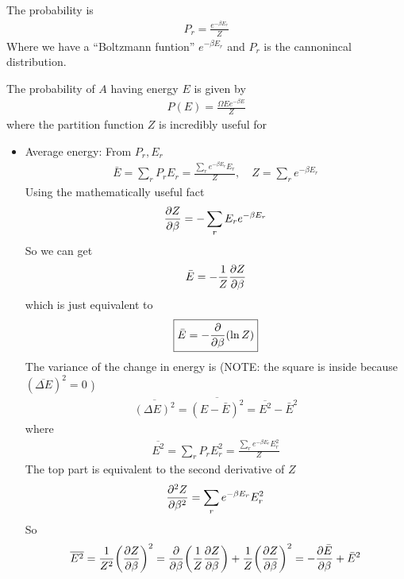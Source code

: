 \documentclass[../main.tex]{subfiles}
\begin{document}
The probability is
\begin{align*}
    P_r = \frac{e^{-\beta E_r}}{Z}
\end{align*}
Where we have a ``Boltzmann funtion'' $e^{-\beta E_r}$ and $P_r$ is the cannonincal distribution.

\newpage
{}
The probability of $A$ having energy $E$ is given by
\begin{align*}
    P(E) = \frac{\Omega{E} e^{-\beta E}}{Z} 
\end{align*}
where the partition function $Z$ is incredibly useful for
\begin{itemize}
    \item Average energy: From $P_r, E_r$
    \begin{align*}
        \bar E = \sum_r P_r E_r = \frac{\sum_r e^{-\beta E_r} E_r}{Z}, \quad Z = \sum_r e^{-\beta E_r}
    \end{align*}
    Using the mathematically useful fact
    \begin{align*}
        \pdv{Z}{\beta} = -\sum_r E_r e^{-\beta E_r}
    \end{align*}
    So we can get
    \begin{align*}
        \bar E = -\frac{1}{Z} \pdv{Z}{\beta}
    \end{align*}
    which is just equivalent to
    \begin{align*}
        \boxed{
            \bar E = -\pdv{\beta}(\ln Z)
        }
    \end{align*}
    The variance of the change in energy is (NOTE: the square is inside because $(\overline{\Delta E})^2 = 0$ )
    \begin{align*}
        \overline{(\Delta E)^2} = \overline{(E - \bar E)^2} = \overline{E^2} - \bar E^2
    \end{align*}
    where
    \begin{align*}
        \overline{E^2} = \sum_r P_r E_r^2 = \frac{\sum_r e^{-\beta E_r} E_r^2}{Z}
    \end{align*}
    The top part is equivalent to the second derivative of $Z$
    \begin{align*}
        \pdv[2]{Z}{\beta} = \sum_r e^{-\beta E_r} E_r^2 
    \end{align*}
    So
    \begin{align*}
        \overline{E^2} = \frac{1}{Z^2} \qt(\pdv{Z}{\beta})^2 = \pdv{\beta}(\frac{1}{Z} \pdv{Z}{\beta}) + \frac{1}{Z} \qt(\pdv{Z}{\beta})^2 = -\pdv{\bar E}{\beta} + \bar E^2
    \end{align*}

\end{itemize}
\end{document}
